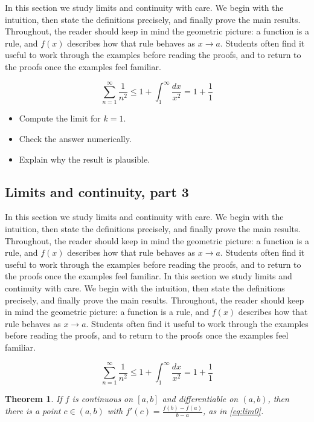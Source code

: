 \documentclass[11pt]{article}
\newtheorem{theorem}{Theorem}[section]
\begin{document}
In this section we study limits and continuity with care. We begin with the intuition, then state the definitions precisely, and finally prove the main results. Throughout, the reader should keep in mind the geometric picture: a function is a rule, and $f(x)$ describes how that rule behaves as $x \to a$. Students often find it useful to work through the examples before reading the proofs, and to return to the proofs once the examples feel familiar. 

\[
  \sum_{n=1}^{\infty} \frac{1}{n^{2}} \le 1 + \int_1^{\infty} \frac{dx}{x^{2}} = 1 + \frac{1}{1}
\]

\begin{itemize}
  \item Compute the limit for $k = 1$.
  \item Check the answer numerically.
  \item Explain why the result is plausible.
\end{itemize}

\subsection{Limits and continuity, part 3}

In this section we study limits and continuity with care. We begin with the intuition, then state the definitions precisely, and finally prove the main results. Throughout, the reader should keep in mind the geometric picture: a function is a rule, and $f(x)$ describes how that rule behaves as $x \to a$. Students often find it useful to work through the examples before reading the proofs, and to return to the proofs once the examples feel familiar. In this section we study limits and continuity with care. We begin with the intuition, then state the definitions precisely, and finally prove the main results. Throughout, the reader should keep in mind the geometric picture: a function is a rule, and $f(x)$ describes how that rule behaves as $x \to a$. Students often find it useful to work through the examples before reading the proofs, and to return to the proofs once the examples feel familiar. 

\[
  \sum_{n=1}^{\infty} \frac{1}{n^{2}} \le 1 + \int_1^{\infty} \frac{dx}{x^{2}} = 1 + \frac{1}{1}
\]

\begin{theorem}
If $f$ is continuous on $[a,b]$ and differentiable on $(a,b)$, then there is a point $c \in (a,b)$ with $f'(c) = \frac{f(b)-f(a)}{b-a}$, as in \eqref{eq:lim0}.
\end{theorem}
\end{document}
